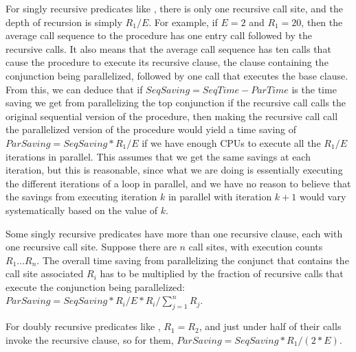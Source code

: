 For singly recursive predicates like \mapfoldl,
there is only one recursive call site,
and the depth of recursion is simply $R_1/E$.
For example, if $E = 2$ and $R_1 = 20$,
then the average call sequence to the procedure
has one entry call followed by the recursive calls.
It also means that the average call sequence
has ten calls that cause the procedure to execute its recursive clause,
the clause containing the conjunction being parallelized,
followed by one call that executes the base clause.
From this, we can deduce that if ${SeqSaving} = {SeqTime} - {ParTime}$
is the time saving we get from parallelizing the top conjunction
if the recursive call calls the original sequential version of the procedure,
then making the recursive call call the parallelized version of the procedure
would yield a time saving of ${ParSaving} = {SeqSaving} * R_1/E$
if we have enough CPUs to execute all the $R_1/E$ iterations in parallel.
This assumes that we get the same savings at each iteration,
but this is reasonable,
since what we are doing is essentially executing
the different iterations of a loop in parallel,
and we have no reason to believe that the savings
from executing iteration $k$ in parallel with iteration $k+1$
would vary systematically based on the value of $k$.

Some singly recursive predicates have more than one recursive clause,
each with one recursive call site.
Suppose there are $n$ call sites, with execution counts $R_1 \ldots R_n$.
The overall time saving from parallelizing the conjunct
that contains the call site associated $R_i$
has to be multiplied by the fraction of recursive calls
that execute the conjunction being parallelized:
${ParSaving} = {SeqSaving} * R_i/E * R_i/\sum_{j=1}^n R_j$.

For doubly recursive predicates like , $R_1 = R_2$,
and just under half of their calls invoke the recursive clause,
so for them, ${ParSaving} = {SeqSaving} * R_1/(2 * E)$.

